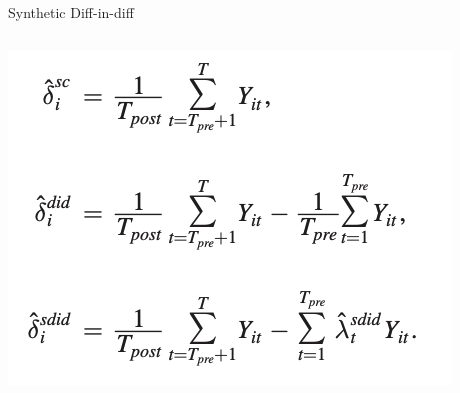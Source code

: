 \documentclass[notes,11pt, aspectratio=169]{beamer}
\begin{document}
\begin{frame}{Synthetic Diff-in-diff}
\begin{columns}[T]
\begin{column}{0.5\textwidth}
{     \includegraphics[width=\linewidth]{images/synth_eq2.png}} 
\end{column}
\end{columns}
\end{frame}
\end{document}
